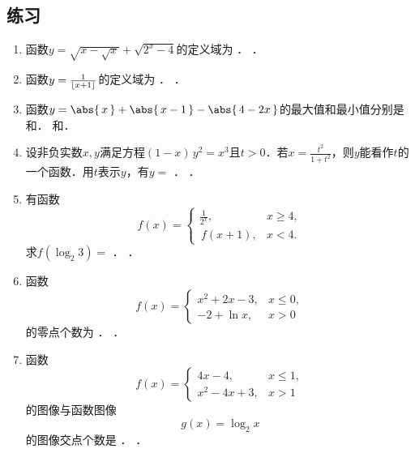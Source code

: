 \subsection*{练习}

\begin{enumerate}
\item 函数\(y = \sqrt{x - \sqrt{x}} + \sqrt{2^x - 4}\)的定义域为
  \ifshowsol
    \uline{}．
  \else
    \uline{\makebox[5em]{}}．
  \fi

\item 函数\(y = \frac1{\lfloor x+1\rfloor}\)的定义域为
  \ifshowsol
    \uline{}．
  \else
    \uline{\makebox[10em]{}}．
  \fi

\item 函数\(y = \abs{\,x\,} + \abs{\,x-1\,} - \abs{\,4-2x\,}\)的最大值和最小值分别是
  \ifshowsol
    \uline{}和\uline{}．
  \else
    \uline{\makebox[3em]{}}和\uline{\makebox[3em]{}}．
  \fi

\item 设非负实数\(x, y\)满足方程\((1-x)\,y^2 = x^3\)且\(t > 0\)．若\(x = \frac{t^2}{1+t^2}\)，则\(y\)能看作\(t\)的一个函数．用\(t\)表示\(y\)，有\(y =\)
  \ifshowsol
    \uline{}．
  \else
    \uline{\makebox[6em]{}}．
  \fi

\item 有函数
  \[
    f(x) =
    \begin{cases}
      \frac1{2^x}, & x \ge 4, \\
      \,f(x+1), & x < 4.
    \end{cases}
  \]
  求\(f(\log_2 3) =\)
  \ifshowsol
    \uline{}．
  \else
    \uline{\makebox[4em]{}}．
  \fi

\item 函数
  \[
    f(x) =
    \begin{cases}
      x^2 + 2x - 3, & x \le 0, \\
      -2 + \ln x, & x > 0
    \end{cases}
  \]
  的零点个数为
  \ifshowsol
    \uline{}．
  \else
    \uline{\makebox[3em]{}}．
  \fi

\item 函数
  \[
    f(x) =
    \begin{cases}
      4x - 4, & x \le 1, \\
      x^2 - 4x + 3, & x > 1
    \end{cases}
  \]
  的图像与函数图像
  \[
    g(x) = \log_2 x
  \]
  的图像交点个数是
  \ifshowsol
    \uline{}．
  \else
    \uline{\makebox[3em]{}}．
  \fi


\end{enumerate}
